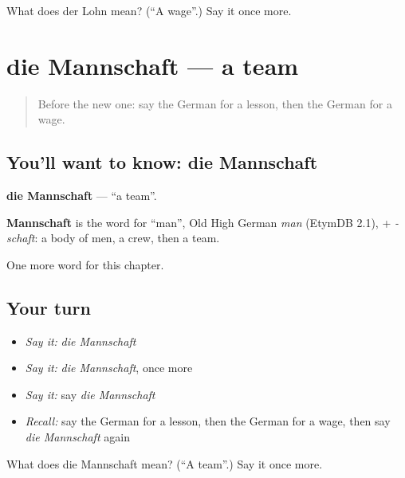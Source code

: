 \begin{tcolorbox}[breakable,colback=teal!4,colframe=teal!35!black,title={Before you move on}]
What does der Lohn mean? (\textquotedblleft{}A wage\textquotedblright{}.) Say it once more.
\end{tcolorbox}
\section[die Mannschaft]{die Mannschaft — a team}

\label{lesson:GE-C234-mannschaft}



\begin{quote}
Before the new one: say the German for a lesson, then the German for a wage.
\end{quote}

\subsection*{You'll want to know: die Mannschaft}
\textbf{die Mannschaft} — \textquotedblleft{}a team\textquotedblright{}.

\begin{cousinweb}
\textbf{Mannschaft} is the word for \textquotedblleft{}man\textquotedblright{}, Old High German \emph{man} (EtymDB 2.1), + \emph{-schaft}: a body of men, a crew, then a team.
\end{cousinweb}

\begin{grammarlens}[title={What you've built}]
One more word for this chapter.
\end{grammarlens}

\subsection*{Your turn}
\begin{itemize}
\raggedright
  \item \emph{Say it:} \emph{die Mannschaft}
  \item \emph{Say it:} \emph{die Mannschaft}, once more
  \item \emph{Say it:} say \emph{die Mannschaft}
  \item \emph{Recall:} say the German for a lesson, then the German for a wage, then say \emph{die Mannschaft} again
\end{itemize}

\begin{tcolorbox}[breakable,colback=teal!4,colframe=teal!35!black,title={Before you move on}]
What does die Mannschaft mean? (\textquotedblleft{}A team\textquotedblright{}.) Say it once more.
\end{tcolorbox}
